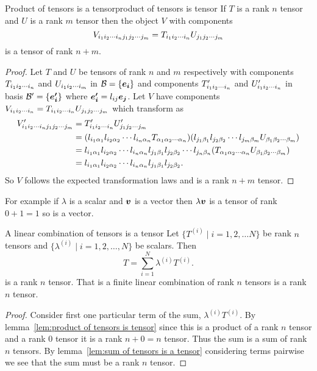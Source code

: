 \begin{lemma}{Product of tensors is a tensor}{product of tensors is tensor}
    If \(T\) is a rank \(n\) tensor and \(U\) is a rank \(m\) tensor then the object \(V\) with components
    \[V_{{ {i}_1 {i}_2 \dotsm {i}_{n} }{ {j}_1 {j}_2 \dotsm {j}_{m} }} = T_{{ {i}_1 {i}_2 \dotsm {i}_{n} }}U_{{ {j}_1 {j}_2 \dotsm {j}_{m} }}\]
    is a tensor of rank \(n + m\).
\end{lemma}
\begin{proof}
    Let \(T\) and \(U\) be tensors of rank \(n\) and \(m\) respectively with components \(T_{ {i}_1 {i}_2 \dotsm {i}_{n} }\) and \(U_{ {i}_1 {i}_2 \dotsm {i}_{m} }\) in \(\mathcal{B} = \{\bm{e_{i}}\}\) and components \(T'_{ {i}_1 {i}_2 \dotsm {i}_{n} }\) and \(U'_{ {i}_1 {i}_2 \dotsm {i}_{n} }\) in basis \(\mathcal{B}' = \{\bm{e'_{i}}\}\) where \(\bm{e'_{i}} = l_{ij}\bm{e_{j}}\).
    Let \(V\) have components \(V_{ {i}_1 {i}_2 \dotsm {i}_{n} } = T_{ {i}_1 {i}_2 \dotsm {i}_{n} } U_{ {j}_1 {j}_2 \dotsm {j}_{m} }\) which transform as
    \begin{align*}
        V'_{{ {i}_1 {i}_2 \dotsm {i}_{n} }{ {j}_1 {j}_2 \dotsm {j}_{m} }} &= T'_{{ {i}_1 {i}_2 \dotsm {i}_{n} }}U'_{{ {j}_1 {j}_2 \dotsm {j}_{m} }}\\
        &= (l_{i_1\alpha_1}l_{i_2\alpha_2} \dotsm l_{i_n\alpha_n} T_{{ {\alpha}_1 {\alpha}_2 \dotsm {\alpha}_{n} }})(l_{j_1\beta_1}l_{j_2\beta_2} \dotsm l_{j_m\beta_m} U_{{ {\beta}_1 {\beta}_2 \dotsm {\beta}_{m} }})\\
        &= l_{i_1\alpha_1}l_{i_2\alpha_2} \dotsm l_{i_n\alpha_n} l_{j_1\beta_1}l_{j_2\beta_2} \dotsm l_{j_n\beta_n} (T_{{ {\alpha}_1 {\alpha}_2 \dotsm {\alpha}_{n} }}U_{{ {\beta}_1 {\beta}_2 \dotsm {\beta}_{m} }})\\
        &= l_{i_1\alpha_1}l_{i_2\alpha_2} \dotsm l_{i_n\alpha_n} l_{j_1\beta_1}l_{j_2\beta_2}.
    \end{align*}
    So \(V\) follows the expected transformation laws and is a rank \(n + m\) tensor.
\end{proof}
For example if \(\lambda\) is a scalar and \(\bm{v}\) is a vector then \(\lambda\bm{v}\) is a tensor of rank \(0 + 1 = 1\) so is a vector.

\begin{corollary}{A linear combination of tensors is a tensor}{}
    Let \(\{T^(i)\mid i = 1, 2, \dotsc N \}\) be rank \(n\) tensors and \(\{\lambda^(i)\mid i = 1, 2, \dotsc, N\}\) be scalars.
    Then
    \[T = \sum_{i=1}^{N} \lambda^(i)T^(i).\]
    is a rank \(n\) tensor.
    That is a finite linear combination of rank \(n\) tensors is a rank \(n\) tensor.
\end{corollary}
\begin{proof}
    Consider first one particular term of the sum, \(\lambda^{(i)}T^{(i)}\).
    By lemma~\ref{lem:product of tensors is tensor} since this is a product of a rank \(n\) tensor and a rank \(0\) tensor it is a rank \(n + 0 = n\) tensor.
    Thus the sum is a sum of rank \(n\) tensors.
    By lemma~\ref{lem:sum of tensors is a tensor} considering terms pairwise we see that the sum must be a rank \(n\) tensor.
\end{proof}

